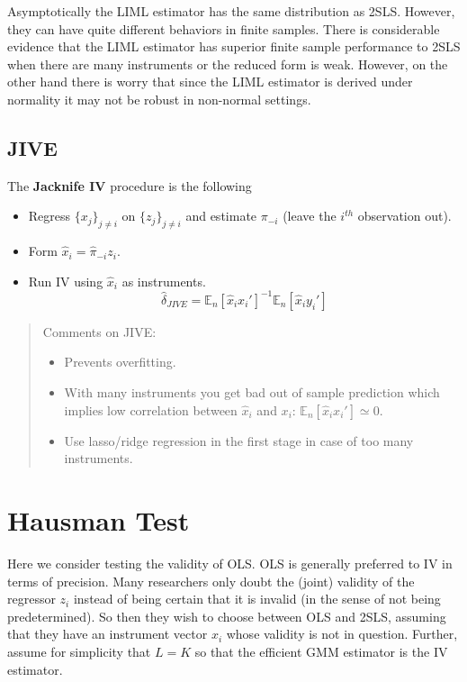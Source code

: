 \documentclass[12pt,]{book}
\providecommand{\tightlist}{%
  \setlength{\itemsep}{0pt}\setlength{\parskip}{0pt}}
\begin{document}
Asymptotically the LIML estimator has the same distribution as 2SLS. However, they can have quite different behaviors in finite samples. There is considerable evidence that the LIML estimator has superior finite sample performance to 2SLS when there are many instruments or the reduced form is weak. However, on the other hand there is worry that since the LIML estimator is derived under normality it may not be robust in non-normal settings.

\hypertarget{jive}{%
\subsection{JIVE}\label{jive}}

The \textbf{Jacknife IV} procedure is the following

\begin{itemize}
\tightlist
\item
  Regress \(\{ x_j \} _ {j \neq i}\) on \(\{ z_j \} _ {j \neq i}\) and estimate \(\pi_{-i}\) (leave the \(i^{th}\) observation out).
\item
  Form \(\hat{x}_i = \hat{\pi} _ {-i} z_i\).
\item
  Run IV using \(\hat{x}_i\) as instruments.
  \[
    \hat{\delta} _ {JIVE} = \mathbb E_n[\hat{x}_i x_i']^{-1} \mathbb E_n[\hat{x}_i y_i']
  \]
\end{itemize}

\begin{quote}
Comments on JIVE:

\begin{itemize}
\tightlist
\item
  Prevents overfitting.
\item
  With many instruments you get bad out of sample prediction which implies low correlation between \(\hat{x}_i\) and \(x_i\): \(\mathbb E_n[\hat{x}_i x_i'] \simeq 0\).
\item
  Use lasso/ridge regression in the first stage in case of too many instruments.
\end{itemize}
\end{quote}

\hypertarget{hausman-test}{%
\section{Hausman Test}\label{hausman-test}}

Here we consider testing the validity of OLS. OLS is generally preferred to IV in terms of precision. Many researchers only doubt the (joint) validity of the regressor \(z_i\) instead of being certain that it is invalid (in the sense of not being predetermined). So then they wish to choose between OLS and 2SLS, assuming that they have an instrument vector \(x_i\) whose validity is not in question. Further, assume for simplicity that \(L = K\) so that the efficient GMM estimator is the IV estimator.
\end{document}
